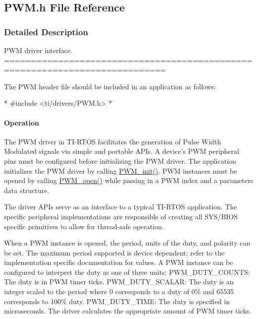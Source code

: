\subsection{P\-W\-M.\-h File Reference}
\label{_p_w_m_8h}


\subsubsection{Detailed Description}
P\-W\-M driver interface. ============================================================================

The P\-W\-M header file should be included in an application as follows\-: 
\begin{DoxyCode}
*  #include <ti/drivers/PWM.h>
*  
\end{DoxyCode}


\paragraph*{Operation}

The P\-W\-M driver in T\-I-\/\-R\-T\-O\-S facilitates the generation of Pulse Width Modulated signals via simple and portable A\-P\-Is. A device's P\-W\-M peripheral pins must be configured before initializing the P\-W\-M driver. The application initializes the P\-W\-M driver by calling \hyperlink{_p_w_m_8h_aadae3fe77e36cbf9643a22eeb99fb01e}{P\-W\-M\-\_\-init()}. P\-W\-M instances must be opened by calling \hyperlink{_p_w_m_8h_ac963beab0c5c6901bf852f175028aeaf}{P\-W\-M\-\_\-open()} while passing in a P\-W\-M index and a parameters data structure.

The driver A\-P\-Is serve as an interface to a typical T\-I-\/\-R\-T\-O\-S application. The specific peripheral implementations are responsible of creating all S\-Y\-S/\-B\-I\-O\-S specific primitives to allow for thread-\/safe operation.

When a P\-W\-M instance is opened, the period, units of the duty, and polarity can be set. The maximum period supported is device dependent; refer to the implementation specific documentation for values. A P\-W\-M instance can be configured to interpret the duty as one of three units\-: P\-W\-M\-\_\-\-D\-U\-T\-Y\-\_\-\-C\-O\-U\-N\-T\-S\-: The duty is in P\-W\-M timer ticks. P\-W\-M\-\_\-\-D\-U\-T\-Y\-\_\-\-S\-C\-A\-L\-A\-R\-: The duty is an integer scaled to the period where 0 corresponds to a duty of 0\% and 65535 corresponds to 100\% duty. P\-W\-M\-\_\-\-D\-U\-T\-Y\-\_\-\-T\-I\-M\-E\-: The duty is specified in microseconds. The driver calculates the appropriate amount of P\-W\-M timer ticks.

